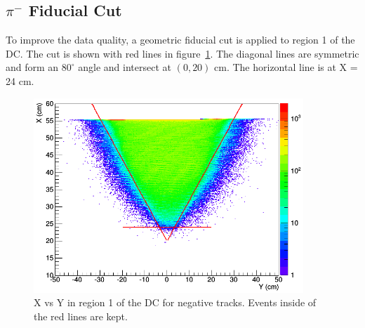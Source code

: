 \subsection{$\pi^-$ Fiducial Cut}
To improve the data quality, a geometric fiducial cut is applied to region 1 of the DC.
The cut is shown with red lines in figure~\ref{fig:pim_R1cut_s4}.
The diagonal lines are symmetric and form an $80^\circ$ angle and intersect at $(0, 20)$ cm.
The horizontal line is at X = 24 cm.
\begin{figure}[htp]
\centering
\includegraphics[width=4in]{figures/pim_R1cut_s4.png}
\caption{X vs Y in region 1 of the DC for negative tracks. Events inside of the red lines are kept.}
\label{fig:pim_R1cut_s4}
\end{figure}
%


